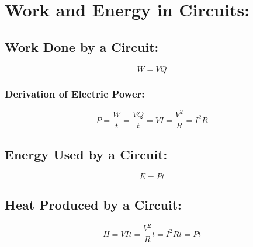 \documentclass[a4paper]{report}
\begin{document}
    \section{Work and Energy in Circuits:}
        \subsection{Work Done by a Circuit:}
            \begin{equation}
                W = VQ
            \end{equation}
        \subsubsection{Derivation of Electric Power:}
            \begin{equation}
                P = \frac{W}{t} = \frac{VQ}{t} = VI = \frac{V^2}{R} = I^2 R 
            \end{equation}
        \subsection{Energy Used by a Circuit:}
            \begin{equation}
                E = Pt
            \end{equation}
        \subsection{Heat Produced by a Circuit:}
            \begin{equation}
                H = VIt = \frac{V^2}{R}t = I^2 Rt = Pt
            \end{equation}

            
\end{document}
